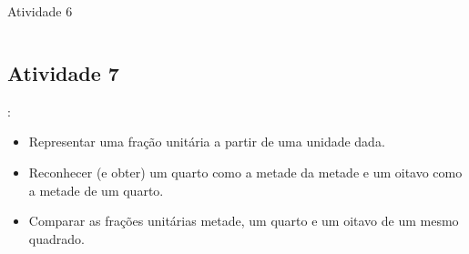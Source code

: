 \begin{multicols}{2}
\begin{resposta*}{Atividade 6}
\begin{tabular}{ccc}
\end{tabular}

\end{resposta*}



\subsection{Atividade 7}

  : \vspace{.1cm}
  
\begin{itemize} %
    \item       Representar uma fração unitária a partir de uma unidade dada.
    \item       Reconhecer (e obter) um quarto como a metade da metade e um oitavo como a metade de um quarto.
    \item       Comparar as frações unitárias metade, um quarto e um oitavo de um mesmo quadrado.
\end{itemize} %

 \vspace{.1cm}
 
   \vspace{.1cm}


\end{multicols}
